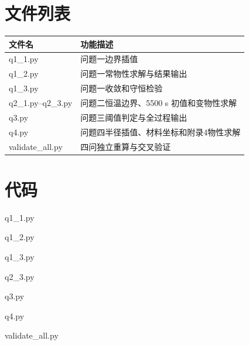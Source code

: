 \documentclass[withoutpreface,bwprint]{cumcm_thesis}
\begin{document}
\newpage
\begin{appendices}
\section{文件列表}
\begin{table}[H]
\centering
\begin{tabularx}{\textwidth}{LL}
\toprule
文件名   & 功能描述 \\
\midrule
q1\_1.py & 问题一边界插值 \\
q1\_2.py & 问题一常物性求解与结果输出 \\
q1\_3.py & 问题一收敛和守恒检验 \\
q2\_1.py--q2\_3.py & 问题二恒温边界、5500 s 初值和变物性求解 \\
q3.py & 问题三阈值判定与全过程输出 \\
q4.py & 问题四半径插值、材料坐标和附录4物性求解 \\
validate\_all.py & 四问独立重算与交叉验证 \\
\bottomrule
\end{tabularx}
\label{tab:文件列表}
\end{table}

\section{代码}
\noindent q1\_1.py

q1\_2.py

q1\_3.py

q2\_3.py

q3.py

q4.py

validate\_all.py

\end{appendices}
\end{document}
